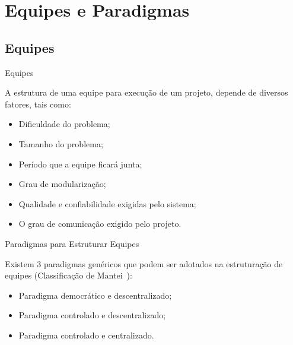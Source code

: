 \documentclass[xcolor=x11names,compress]{beamer}
\begin{document}
\section{Equipes e Paradigmas}
\subsection{Equipes}

\begin{frame}{Equipes}

A estrutura de uma equipe para execução de um projeto, depende de diversos fatores, tais como:

\begin{itemize}
\itemsep 5mm

\item Dificuldade do problema;

\item Tamanho do problema;

\item Período que a equipe ficará junta;

\item Grau de modularização;

\item Qualidade e confiabilidade exigidas pelo sistema;

\item O grau de comunicação exigido pelo projeto.

\end{itemize}

\end{frame}

\begin{frame}{Paradigmas para Estruturar Equipes}

Existem 3 paradigmas genéricos que podem ser adotados na estruturação de equipes (Classificação de Mantei~\cite{Pressman-2001}):

\begin{itemize}

\itemsep 5mm

\item Paradigma democrático e descentralizado;

\item Paradigma controlado e descentralizado;

\item Paradigma controlado e centralizado.

\end{itemize}

\end{frame}
\end{document}
